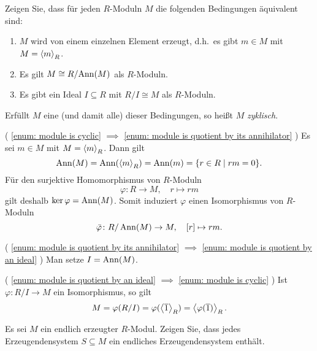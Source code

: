 \begin{question}[subtitle = Charakterisierung zyklischer Moduln]
  Zeigen Sie, dass für jeden $R$-Moduln $M$ die folgenden Bedingungen äquivalent sind:
  \begin{enumerate}
    \item
      \label{enum: module is cyclic}
      $M$ wird von einem einzelnen Element erzeugt, d.h.\ es gibt $m \in M$ mit $M = \left\langle m \right\rangle_R$.
    \item
      \label{enum: module is quotient by its annihilator}
      Es gilt $M \cong R/\!\operatorname{Ann}(M)$ als $R$-Moduln.
    \item
      \label{enum: module is quotient by an ideal}
      Es gibt ein Ideal $I \subseteq R$ mit $R/I \cong M$ als $R$-Moduln.
  \end{enumerate}
  Erfüllt $M$ eine (und damit alle) dieser Bedingungen, so heißt $M$ \emph{zyklisch}.
\end{question}


\begin{solution}
  (
    \ref{enum: module is cyclic}
    $\implies$
    \ref{enum: module is quotient by its annihilator}
  )
  Es sei $m \in M$ mit $M = \left\langle m \right\rangle_R$.
  Dann gilt
  \[
      \operatorname{Ann}(M)
    = \operatorname{Ann}(\left\langle m \right\rangle_R)
    = \operatorname{Ann}(m)
    = \{r \in R \mid rm = 0\}.
  \]
  Für den surjektive Homomorphismus von $R$-Moduln
  \[
            \varphi
    \colon  R \to M,
    \quad
            r \mapsto rm
  \]
  gilt deshalb $\ker \varphi = \operatorname{Ann}(M)$.
  Somit induziert $\varphi$ einen Isomorphismus von $R$-Moduln
  \[
            \bar{\varphi}
    \colon  R/\operatorname{Ann}(M) \to M,
    \quad
            [r] \mapsto rm.
  \]
  
  (
    \ref{enum: module is quotient by its annihilator}
    $\implies$
    \ref{enum: module is quotient by an ideal}
  )
  Man setze $I = \operatorname{Ann}(M)$.
  
  (
    \ref{enum: module is quotient by an ideal}
    $\implies$
    \ref{enum: module is cyclic}
  )
  Ist $\varphi \colon R/I \to M$ ein Isomorphismus, so gilt
  \[
      M
    = \varphi(R/I)
    = \varphi(\left\langle \overline{1} \right\rangle_R)
    = \left\langle \varphi(\overline{1}) \right\rangle_R.
  \]
\end{solution}


\begin{question}[subtitle = Existenz endlicher Erzeugendensysteme]
  \label{question: in a finitely generated module every generating set contains a finite generatin set}
  Es sei $M$ ein endlich erzeugter $R$-Modul.
  Zeigen Sie, dass jedes Erzeugendensystem $S \subseteq M$ ein endliches Erzeugendensystem enthält.
\end{question}



